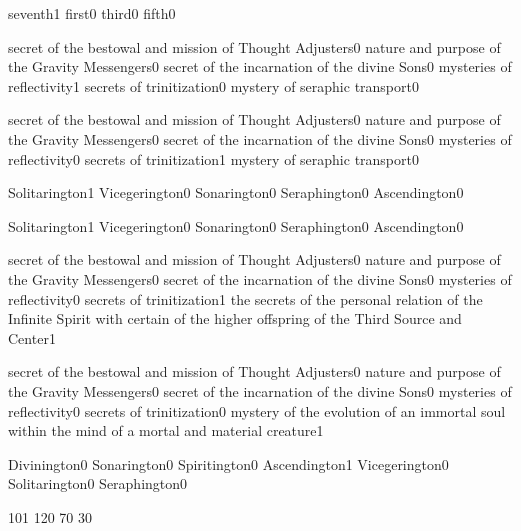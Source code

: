 {seventh}{1}
{first}{0}
{third}{0}
{fifth}{0}
\qstop

{secret of the bestowal and mission of Thought Adjusters}{0}
{nature and purpose of the Gravity Messengers}{0}
{secret of the incarnation of the divine Sons}{0}
{mysteries of reflectivity}{1}
{secrets of trinitization}{0}
{mystery of seraphic transport}{0}
\qstop

{secret of the bestowal and mission of Thought Adjusters}{0}
{nature and purpose of the Gravity Messengers}{0}
{secret of the incarnation of the divine Sons}{0}
{mysteries of reflectivity}{0}
{secrets of trinitization}{1}
{mystery of seraphic transport}{0}
\qstop

{Solitarington}{1}
{Vicegerington}{0}
{Sonarington}{0}
{Seraphington}{0}
{Ascendington}{0}
\qstop

{Solitarington}{1}
{Vicegerington}{0}
{Sonarington}{0}
{Seraphington}{0}
{Ascendington}{0}
\qstop

{secret of the bestowal and mission of Thought Adjusters}{0}
{nature and purpose of the Gravity Messengers}{0}
{secret of the incarnation of the divine Sons}{0}
{mysteries of reflectivity}{0}
{secrets of trinitization}{1}
{the secrets of the personal relation of the Infinite Spirit with certain of the higher offspring of the Third Source and Center}{1}
\qstop

{secret of the bestowal and mission of Thought Adjusters}{0}
{nature and purpose of the Gravity Messengers}{0}
{secret of the incarnation of the divine Sons}{0}
{mysteries of reflectivity}{0}
{secrets of trinitization}{0}
{mystery of the evolution of an immortal soul within the mind of a mortal and material creature}{1}
\qstop

{Divinington}{0}
{Sonarington}{0}
{Spiritington}{0}
{Ascendington}{1}
{Vicegerington}{0}
{Solitarington}{0}
{Seraphington}{0}
\qstop

{10}{1}
{12}{0}
{7}{0}
{3}{0}
\qstop


